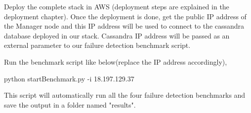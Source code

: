 Deploy the complete stack in AWS (deployment steps are explained in the deployment chapter). Once the deployment is done, get the public IP address of the Manager node and this IP address will be used to connect to the cassandra database deployed in our stack. Cassandra IP address will be passed as an external parameter to our failure detection benchmark script.

Run the benchmark script like below(replace the IP address accordingly),

\begin{center}
    python startBenchmark.py -i 18.197.129.37
\end{center}

This script will automatically run all the four failure detection benchmarks and save the output in a folder named "results".


